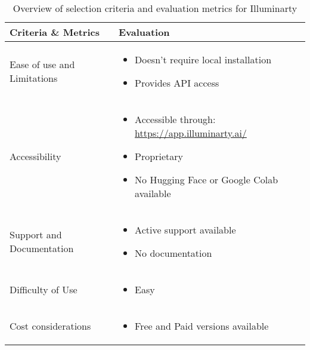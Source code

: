 \begin{table}[htpb]
	\caption{Overview of selection criteria and evaluation metrics for Illuminarty}\label{tab:illuminarty-overview}
	\centering
	\small
	\begin{tabularx}{\textwidth}{l X}
		\toprule
		\textbf{Criteria \& Metrics} & \textbf{Evaluation}                                        \\
		\midrule
		Ease of use and Limitations  & \begin{itemize}[nosep,nolistsep,noitemsep]
			                               \item Doesn't require local installation
			                               \item Provides \ac{API} access
		                               \end{itemize}                  \\
		Accessibility                & \begin{itemize}[nosep,nolistsep,noitemsep]
			                               \item Accessible through: \url{https://app.illuminarty.ai/}
			                               \item Proprietary
			                               \item No Hugging Face or Google Colab available
		                               \end{itemize} \\
		Support and Documentation    & \begin{itemize}[nosep,nolistsep,noitemsep]
			                               \item Active support available
			                               \item No documentation
		                               \end{itemize}                  \\
		Difficulty of Use            & \begin{itemize}[nosep,nolistsep,noitemsep]
			                               \item Easy
		                               \end{itemize}                  \\
		Cost considerations          & \begin{itemize}[nosep,nolistsep,noitemsep]
			                               \item Free and Paid versions available
		                               \end{itemize}                  \\

\end{tabularx}
\end{table}

